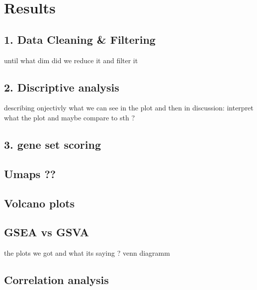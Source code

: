 \documentclass[
  parskip,
  oneside]{scrreprt}
\begin{document}
\hypertarget{results-1}{%
\chapter{Results}\label{results-1}}

\hypertarget{data-cleaning-filtering}{%
\section{1. Data Cleaning \& Filtering}\label{data-cleaning-filtering}}

until what dim did we reduce it and filter it

\hypertarget{discriptive-analysis}{%
\section{2. Discriptive analysis}\label{discriptive-analysis}}

describing onjectivly what we can see in the plot and then in
discussion: interpret what the plot and maybe compare to sth ?

\hypertarget{gene-set-scoring}{%
\section{3. gene set scoring}\label{gene-set-scoring}}

\hypertarget{umaps}{%
\section{Umaps ??}\label{umaps}}

\hypertarget{volcano-plots}{%
\section{Volcano plots}\label{volcano-plots}}

\hypertarget{gsea-vs-gsva-1}{%
\section{GSEA vs GSVA}\label{gsea-vs-gsva-1}}

the plots we got and what its saying ? venn diagramm

\hypertarget{correlation-analysis}{%
\section{Correlation analysis}\label{correlation-analysis}}
\end{document}
